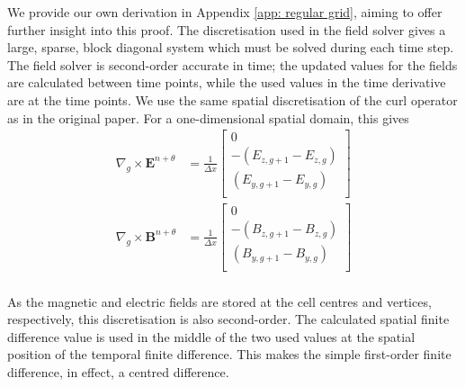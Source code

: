 We provide our own derivation in Appendix \ref{app: regular grid}, aiming to offer further insight into this proof.
The discretisation used in the field solver gives a large, sparse, block diagonal system which must be solved during each time step. The field solver is second-order accurate in time; the updated values for the fields are calculated between time points, while the used values in the time derivative are at the time points. We use the same spatial discretisation of the curl operator as in the original paper. For a one-dimensional spatial domain, this gives
\begin{align}
    \nabla_g \times \mathbf{E}^{n + \theta} &= \frac{1}{\Delta x}\left[\begin{matrix}
        0  \\
        -(E_{z,g+1} - E_{z,g})\\
            (E_{y,g+1} - E_{y,g})\\
    \end{matrix}\right]\\
    \nabla_g \times \mathbf{B}^{n + \theta} &= \frac{1}{\Delta x}\left[\begin{matrix}
        0  \\
        -(B_{z,g+1} - B_{z,g})\\
            (B_{y,g+1} - B_{y,g})\\
    \end{matrix}\right]\\
\end{align}

As the magnetic and electric fields are stored at the cell centres and vertices, respectively, this discretisation is also second-order. The calculated spatial finite difference value is used in the middle of the two used values at the spatial position of the temporal finite difference. This makes the simple first-order finite difference, in effect, a centred difference. 

